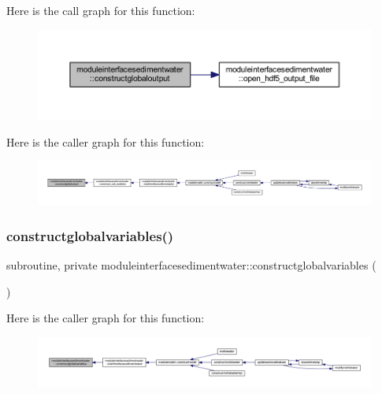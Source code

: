 Here is the call graph for this function\+:\nopagebreak
\begin{figure}[H]
\begin{center}
\leavevmode
\includegraphics[width=350pt]{namespacemoduleinterfacesedimentwater_ac6a2892e7ef45d76ecf31efda1d69f96_cgraph}
\end{center}
\end{figure}
Here is the caller graph for this function\+:\nopagebreak
\begin{figure}[H]
\begin{center}
\leavevmode
\includegraphics[width=350pt]{namespacemoduleinterfacesedimentwater_ac6a2892e7ef45d76ecf31efda1d69f96_icgraph}
\end{center}
\end{figure}
\mbox{\label{namespacemoduleinterfacesedimentwater_a6f12890d7a3c41413a03f74cc366bd1a}} 
\subsubsection{\texorpdfstring{constructglobalvariables()}{constructglobalvariables()}}
{\footnotesize\ttfamily subroutine, private moduleinterfacesedimentwater\+::constructglobalvariables (\begin{DoxyParamCaption}{ }\end{DoxyParamCaption})\hspace{0.3cm}{\ttfamily [private]}}

Here is the caller graph for this function\+:\nopagebreak
\begin{figure}[H]
\begin{center}
\leavevmode
\includegraphics[width=350pt]{namespacemoduleinterfacesedimentwater_a6f12890d7a3c41413a03f74cc366bd1a_icgraph}
\end{center}
\end{figure}
\mbox{\label{namespacemoduleinterfacesedimentwater_a77697f9640e26157a55381bdf7158131}} 
